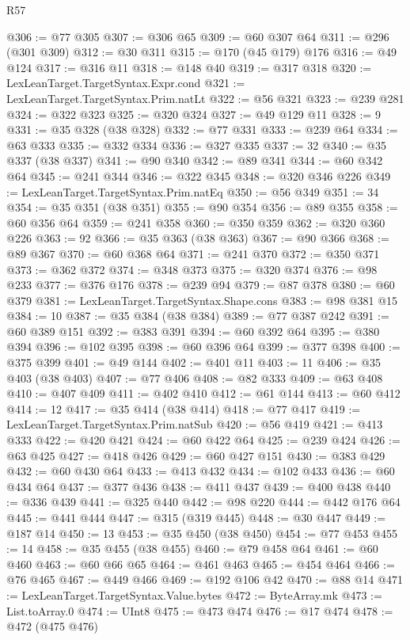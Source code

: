 \begin{lexlean}{R57}
\begin{coremodule}
@306 := @77 @305
@307 := @306 @65
@309 := @60 @307 @64
@311 := @296 (@301 @309)
@312 := @30 @311
@315 := @170 (@45 @179) @176
@316 := @49 @124
@317 := @316 @11
@318 := @148 @40
@319 := @317 @318
@320 := LexLeanTarget.TargetSyntax.Expr.cond
@321 := LexLeanTarget.TargetSyntax.Prim.natLt
@322 := @56 @321
@323 := @239 @281
@324 := @322 @323
@325 := @320 @324
@327 := @49 @129 @11
@328 := 9
@331 := @35 @328 (@38 @328)
@332 := @77 @331
@333 := @239 @64
@334 := @63 @333
@335 := @332 @334
@336 := @327 @335
@337 := 32
@340 := @35 @337 (@38 @337)
@341 := @90 @340
@342 := @89 @341
@344 := @60 @342 @64
@345 := @241 @344
@346 := @322 @345
@348 := @320 @346 @226
@349 := LexLeanTarget.TargetSyntax.Prim.natEq
@350 := @56 @349
@351 := 34
@354 := @35 @351 (@38 @351)
@355 := @90 @354
@356 := @89 @355
@358 := @60 @356 @64
@359 := @241 @358
@360 := @350 @359
@362 := @320 @360 @226
@363 := 92
@366 := @35 @363 (@38 @363)
@367 := @90 @366
@368 := @89 @367
@370 := @60 @368 @64
@371 := @241 @370
@372 := @350 @371
@373 := @362 @372
@374 := @348 @373
@375 := @320 @374
@376 := @98 @233
@377 := @376 @176
@378 := @239 @94
@379 := @87 @378
@380 := @60 @379
@381 := LexLeanTarget.TargetSyntax.Shape.cons
@383 := @98 @381 @15
@384 := 10
@387 := @35 @384 (@38 @384)
@389 := @77 @387 @242
@391 := @60 @389 @151
@392 := @383 @391
@394 := @60 @392 @64
@395 := @380 @394
@396 := @102 @395
@398 := @60 @396 @64
@399 := @377 @398
@400 := @375 @399
@401 := @49 @144
@402 := @401 @11
@403 := 11
@406 := @35 @403 (@38 @403)
@407 := @77 @406
@408 := @82 @333
@409 := @63 @408
@410 := @407 @409
@411 := @402 @410
@412 := @61 @144
@413 := @60 @412
@414 := 12
@417 := @35 @414 (@38 @414)
@418 := @77 @417
@419 := LexLeanTarget.TargetSyntax.Prim.natSub
@420 := @56 @419
@421 := @413 @333
@422 := @420 @421
@424 := @60 @422 @64
@425 := @239 @424
@426 := @63 @425
@427 := @418 @426
@429 := @60 @427 @151
@430 := @383 @429
@432 := @60 @430 @64
@433 := @413 @432
@434 := @102 @433
@436 := @60 @434 @64
@437 := @377 @436
@438 := @411 @437
@439 := @400 @438
@440 := @336 @439
@441 := @325 @440
@442 := @98 @220
@444 := @442 @176 @64
@445 := @441 @444
@447 := @315 (@319 @445)
@448 := @30 @447
@449 := @187 @14
@450 := 13
@453 := @35 @450 (@38 @450)
@454 := @77 @453
@455 := 14
@458 := @35 @455 (@38 @455)
@460 := @79 @458 @64
@461 := @60 @460
@463 := @60 @66 @65
@464 := @461 @463
@465 := @454 @464
@466 := @76 @465
@467 := @449 @466
@469 := @192 @106 @42
@470 := @88 @14
@471 := LexLeanTarget.TargetSyntax.Value.bytes
@472 := ByteArray.mk
@473 := List.toArray.{0}
@474 := UInt8
@475 := @473 @474
@476 := @17 @474
@478 := @472 (@475 @476)

\end{coremodule}
\end{lexlean}
